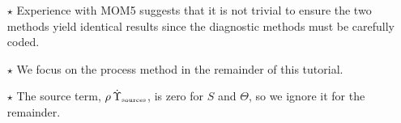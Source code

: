 \documentclass[10pt]{beamer}
\begin{document}
\begin{frame}
\begin{itemize}
\item[$\star$] Experience with MOM5 suggests that it is not trivial to
  ensure the two methods yield identical results since the diagnostic
  methods must be carefully coded. 

\item[$\star$] We focus on the process method in the remainder of this
  tutorial.

\item[$\star$] The source term,
  $\rho \, \dot{\Upsilon}_{\mbox{\tiny sources}}$, is zero for $S$ and
  $\Theta$, so we ignore it for the remainder.

\end{itemize}


\end{frame}
\end{document}
